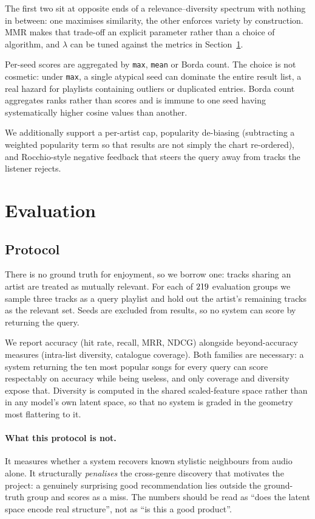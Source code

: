 \documentclass[11pt]{article}
\newcommand{\code}[1]{\texttt{\small #1}}
\begin{document}
The first two sit at opposite ends of a relevance--diversity spectrum with
nothing in between: one maximises similarity, the other enforces variety by
construction. MMR makes that trade-off an explicit parameter rather than a
choice of algorithm, and $\lambda$ can be tuned against the metrics in
Section~\ref{sec:eval}.

Per-seed scores are aggregated by \code{max}, \code{mean} or Borda count. The
choice is not cosmetic: under \code{max}, a single atypical seed can dominate
the entire result list, a real hazard for playlists containing outliers or
duplicated entries. Borda count aggregates ranks rather than scores and is
immune to one seed having systematically higher cosine values than another.

We additionally support a per-artist cap, popularity de-biasing (subtracting a
weighted popularity term so that results are not simply the chart re-ordered),
and Rocchio-style negative feedback that steers the query away from tracks the
listener rejects.

\section{Evaluation}
\label{sec:eval}

\subsection{Protocol}

There is no ground truth for enjoyment, so we borrow one: tracks sharing an
artist are treated as mutually relevant. For each of $219$ evaluation
groups we sample three tracks as a query playlist and hold out the artist's
remaining tracks as the relevant set. Seeds are excluded from results, so no
system can score by returning the query.

We report accuracy (hit rate, recall, MRR, NDCG) alongside beyond-accuracy
measures (intra-list diversity, catalogue coverage). Both families are
necessary: a system returning the ten most popular songs for every query can
score respectably on accuracy while being useless, and only coverage and
diversity expose that. Diversity is computed in the shared scaled-feature space
rather than in any model's own latent space, so that no system is graded in the
geometry most flattering to it.

\paragraph{What this protocol is not.} It measures whether a system recovers
known stylistic neighbours from audio alone. It structurally \emph{penalises}
the cross-genre discovery that motivates the project: a genuinely surprising
good recommendation lies outside the ground-truth group and scores as a miss.
The numbers should be read as ``does the latent space encode real structure'',
not as ``is this a good product''.
\end{document}
